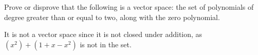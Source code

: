 
\begin{Exercise}[
name={},
title={}, 
difficulty=0,
origin={\cite{JH}}]
Prove or disprove that
the following is a vector space: the set of polynomials of
degree greater than or equal to two, along with the zero polynomial.
\end{Exercise}

\begin{Answer}
It is not a vector space since it is not closed under addition, as
\( (x^2)+(1+x-x^2) \) is not in the set.
\end{Answer}

